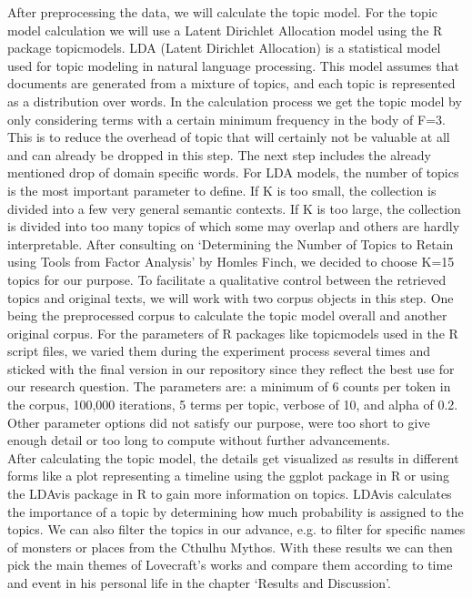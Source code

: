 After preprocessing the data, we will calculate the topic model. For the topic model 
calculation we will use a Latent Dirichlet Allocation model using the R package topicmodels. 
LDA (Latent Dirichlet Allocation) is a statistical model used for topic modeling in natural 
language processing. This model assumes that documents are generated from a mixture of topics, 
and each topic is represented as a distribution over words. In the calculation process we get 
the topic model by only considering terms with a certain minimum frequency in the body of F=3. 
This is to reduce the overhead of topic that will certainly not be valuable at all and can 
already be dropped in this step. The next step includes the already mentioned drop of domain 
specific words. For LDA models, the number of topics is the most important parameter to 
define. If K is too small, the collection is divided into a few very general semantic contexts. 
If K is too large, the collection is divided into too many topics of which some may overlap 
and others are hardly interpretable. After consulting on ‘Determining the Number of Topics 
to Retain using Tools from Factor Analysis’ by Homles Finch, we decided to choose K=15 topics 
for our purpose. To facilitate a qualitative control between the retrieved topics and original 
texts, we will work with two corpus objects in this step. One being the preprocessed corpus 
to calculate the topic model overall and another original corpus. For the parameters of R 
packages like topicmodels used in the R script files, we varied them during the experiment 
process several times and sticked with the final version in our repository since they reflect 
the best use for our research question. The parameters are: a minimum of 6 counts per token 
in the corpus, 100,000 iterations, 5 terms per topic, verbose of 10, and alpha of 0.2. Other 
parameter options did not satisfy our purpose, were too short to give enough detail or too 
long to compute without further advancements.\\

After calculating the topic model, the details get visualized as results in different forms 
like a plot representing a timeline using the ggplot package in R or using the LDAvis package 
in R to gain more information on topics. LDAvis calculates the importance of a topic by 
determining how much probability is assigned to the topics. We can also filter the topics 
in our advance, e.g. to filter for specific names of monsters or places from the Cthulhu 
Mythos. With these results we can then pick the main themes of Lovecraft’s works and compare 
them according to time and event in his personal life in the chapter ‘Results and Discussion’.
